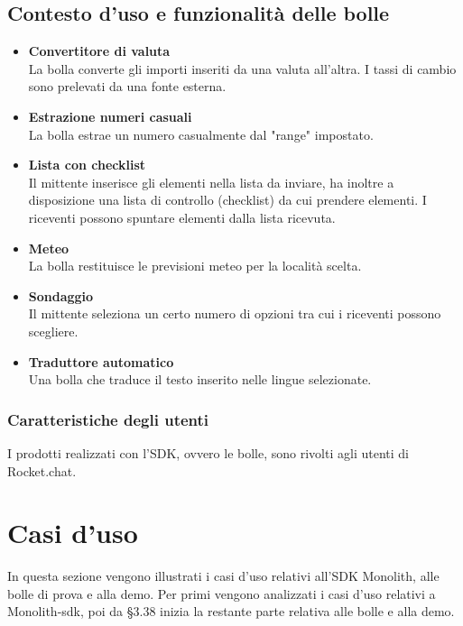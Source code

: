 \subsection{Contesto d'uso e funzionalità delle bolle}
\begin{itemize}
\item \textbf{Convertitore di valuta}\\
La bolla converte gli importi inseriti da una valuta all'altra. I tassi di cambio sono prelevati da una fonte esterna.
\item \textbf{Estrazione numeri casuali}\\
La bolla estrae un numero casualmente dal "range" impostato.
\item \textbf{Lista con checklist}\\
Il mittente inserisce gli elementi nella lista da inviare, ha inoltre a disposizione una lista di controllo (checklist) da cui prendere elementi. I riceventi possono spuntare elementi dalla lista ricevuta.
\item \textbf{Meteo}\\
 La bolla restituisce le previsioni meteo per la località scelta.
\item \textbf{Sondaggio}\\
Il mittente seleziona un certo numero di opzioni tra cui i riceventi possono scegliere.
\item \textbf{Traduttore automatico}\\
Una bolla che traduce il testo inserito nelle lingue selezionate.
\end{itemize}

\subsubsection{Caratteristiche degli utenti}
I prodotti realizzati con l'SDK, ovvero le bolle, sono rivolti agli
utenti di Rocket.chat.





\clearpage
\section{Casi d'uso}
In questa sezione vengono illustrati i casi d'uso relativi all'SDK
Monolith, alle bolle di prova e alla demo. Per primi vengono
analizzati i casi d'uso relativi a Monolith-sdk, poi da \S 3.38
inizia la restante parte relativa alle bolle e alla demo.

